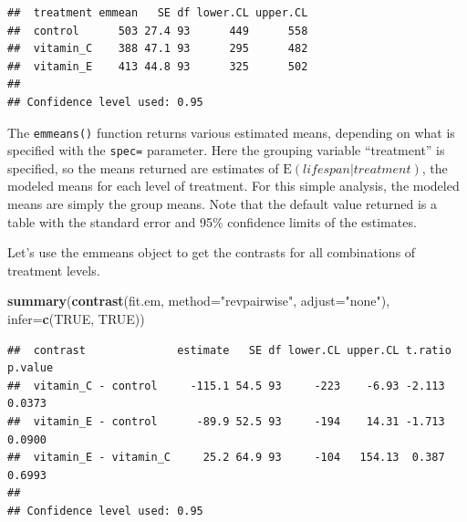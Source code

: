 \documentclass[]{book}
\newenvironment{Shaded}{\begin{snugshade}}{\end{snugshade}}
\newcommand{\DataTypeTok}[1]{\textcolor[rgb]{0.13,0.29,0.53}{#1}}
\newcommand{\KeywordTok}[1]{\textcolor[rgb]{0.13,0.29,0.53}{\textbf{#1}}}
\newcommand{\NormalTok}[1]{#1}
\newcommand{\OtherTok}[1]{\textcolor[rgb]{0.56,0.35,0.01}{#1}}
\newcommand{\StringTok}[1]{\textcolor[rgb]{0.31,0.60,0.02}{#1}}
\begin{document}
\begin{verbatim}
##  treatment emmean   SE df lower.CL upper.CL
##  control      503 27.4 93      449      558
##  vitamin_C    388 47.1 93      295      482
##  vitamin_E    413 44.8 93      325      502
## 
## Confidence level used: 0.95
\end{verbatim}

The \texttt{emmeans()} function returns various estimated means, depending on what is specified with the \texttt{spec=} parameter. Here the grouping variable ``treatment'' is specified, so the means returned are estimates of \(\mathrm{E}(lifespan | treatment)\), the modeled means for each level of treatment. For this simple analysis, the modeled means are simply the group means. Note that the default value returned is a table with the standard error and 95\% confidence limits of the estimates.

Let's use the emmeans object to get the contrasts for all combinations of treatment levels.

\begin{Shaded}
\begin{Highlighting}[]
\KeywordTok{summary}\NormalTok{(}\KeywordTok{contrast}\NormalTok{(fit.em, }\DataTypeTok{method=}\StringTok{"revpairwise"}\NormalTok{, }\DataTypeTok{adjust=}\StringTok{"none"}\NormalTok{), }\DataTypeTok{infer=}\KeywordTok{c}\NormalTok{(}\OtherTok{TRUE}\NormalTok{, }\OtherTok{TRUE}\NormalTok{))}
\end{Highlighting}
\end{Shaded}

\begin{verbatim}
##  contrast              estimate   SE df lower.CL upper.CL t.ratio p.value
##  vitamin_C - control     -115.1 54.5 93     -223    -6.93 -2.113  0.0373 
##  vitamin_E - control      -89.9 52.5 93     -194    14.31 -1.713  0.0900 
##  vitamin_E - vitamin_C     25.2 64.9 93     -104   154.13  0.387  0.6993 
## 
## Confidence level used: 0.95
\end{verbatim}
\end{document}
